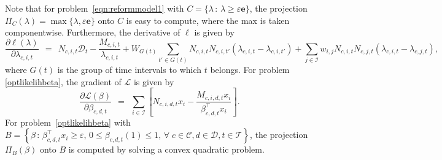 \documentclass[article]{jss}
\begin{document}
Note that for problem~\eqref{eqn:reformmodel1} with $C = \{\lambda \, : \, \lambda \geq \varepsilon \textbf{e}\}$, the projection $\Pi_{C}(\lambda) = \max\{\lambda, \varepsilon \textbf{e}\}$ onto $C$ is easy to compute, where the max is taken componentwise.
Furthermore, the derivative of $\ell$ is given by
\[
\frac{\partial \ell(\lambda)}{\partial \lambda_{c,i,t}} \ \ = \ \ N_{c,i,t} \mathcal{D}_{t} - \frac{M_{c,i,t}}{\lambda_{c,i,t}} + W_{G(t)} \sum_{t' \in G(t)} 
N_{c,i,t} N_{c,i,t'} (\lambda_{c,i,t} - \lambda_{c,i,t'}) + \sum_{j \in \mathcal{I}} w_{i,j} N_{c,i,t} N_{c,j,t} (\lambda_{c,i,t} - \lambda_{c,j,t}),
\]
where $G(t)$ is the group of time intervals to which $t$ belongs.
For problem \eqref{optlikelihbeta}, the gradient of $\mathscr{L}$ is given by
\[
\frac{\partial \mathscr{L}(\beta)}{\partial \beta_{c,d,t}} \ \ = \ \ \sum_{i \in \mathcal{I}} \left[N_{c,i,d,t} x_{i} - \frac{M_{c,i,d,t} x_{i}}{\beta_{c,d,t}^{\top} x_{i}}\right].
\]
\fi
For problem~\eqref{optlikelihbeta} with $B = \left\{\beta \, : \, \beta_{c,d,t}^{\top} x_{i} \geq \varepsilon, \, 0 \leq \beta_{c,d,t}(1) \leq 1,
\, \forall \; c \in \mathcal{C}, d \in \mathcal{D}, t \in \mathcal{T}\right\}$,
the projection $\Pi_{B}(\beta)$ onto $B$ is computed by solving a convex quadratic problem.
\end{document}
